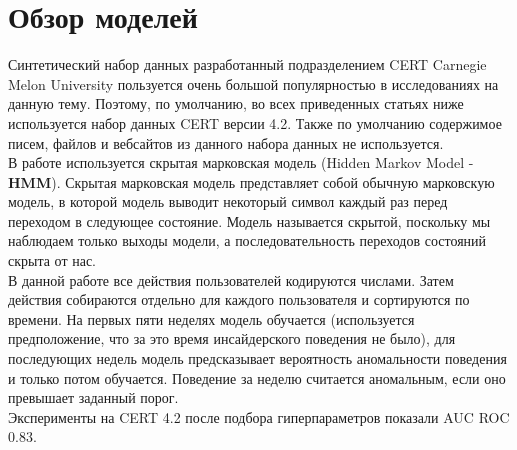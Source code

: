 \section{Обзор моделей}

Синтетический набор данных разработанный подразделением CERT Carnegie Melon University пользуется очень большой популярностью в исследованиях на данную тему. Поэтому, по умолчанию, во всех приведенных статьях ниже используется набор данных CERT версии 4.2. Также по умолчанию содержимое писем, файлов и вебсайтов из данного набора данных не используется.\\

В работе \cite{rashidNewTakeDetecting2016} используется скрытая марковская модель (Hidden Markov Model - \textbf{HMM}). Скрытая марковская модель представляет собой обычную марковскую модель, в которой модель выводит некоторый символ каждый раз перед переходом в следующее состояние. Модель называется скрытой, поскольку мы наблюдаем только выходы модели, а последовательность переходов состояний скрыта от нас.\\
В данной работе все действия пользователей кодируются числами. Затем действия собираются отдельно для каждого пользователя и сортируются по времени. На первых пяти неделях модель обучается (используется предположение, что за это время инсайдерского поведения не было), для последующих недель модель предсказывает вероятность аномальности поведения и только потом обучается. Поведение за неделю считается аномальным, если оно превышает заданный порог.\\
Эксперименты на CERT 4.2 после подбора гиперпараметров показали AUC ROC $0.83$.\\


